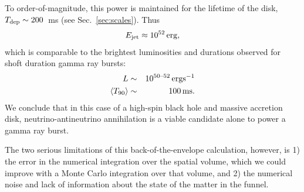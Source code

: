 To order-of-magnitude, this power is maintained for the lifetime of the disk,
$T_{\rm dep}\sim200$~ms (see Sec.~\ref{sec:scales}). Thus
\begin{equation}
  E_{\rm jet} \approx 10^{52} \, {\rm erg} \nonumber,
\end{equation}
which is comparable to the brightest luminosities and durations observed for
shoft duration gamma ray bursts:
\begin{eqnarray}
  L &\sim& 10^{50\text{--}52} \, {\rm erg s^{-1}} \nonumber\\
  \langle T_{90} \rangle &\sim& 100 \,{\rm ms}. \nonumber
\end{eqnarray}
We conclude that in this case of a high-spin black hole and massive accretion
disk, neutrino-antineutrino annihilation is a viable candidate alone to power a
gamma ray burst.

The two serious limitations of this back-of-the-envelope calculation,
however, is 1) the error in the numerical integration over the spatial volume,
which we could improve with a Monte Carlo integration over that volume,
and 2) the numerical noise and lack of information about the state of the matter
in the funnel.

